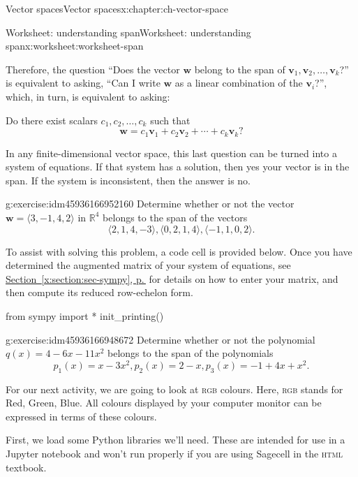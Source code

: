 \documentclass[oneside,10pt,]{book}
\newcommand{\xreffont}{\relax}
\newcommand{\initialism}[1]{\textsc{\MakeLowercase{#1}}}
\numberwithin{equation}{section}
\newcommand{\R}{\mathbb{R}}
\newcommand{\vv}{\mathbf{v}}
\newcommand{\ww}{\mathbf{w}}
\begin{document}
\begin{chapterptx}{Vector spaces}{}{Vector spaces}{}{}{x:chapter:ch-vector-space}
\begin{worksheet-section}{Worksheet: understanding span}{}{Worksheet: understanding span}{}{}{x:worksheet:worksheet-span}
\par
Therefore, the question ``Does the vector \(\ww\) belong to the span of \(\vv_1, \vv_2,\ldots, \vv_k\)?'' is equivalent to asking, ``Can I write \(\ww\) as a linear combination of the \(\vv_i\)?'', which, in turn, is equivalent to asking:%
\par
Do there exist scalars \(c_1,c_2,\ldots, c_k\) such that%
\begin{equation*}
\ww=c_1\vv_1+c_2\vv_2+\cdots +c_k\vv_k\text{?}
\end{equation*}
%
\par
In any finite-dimensional vector space, this last question can be turned into a system of equations. If that system has a solution, then yes \textemdash{} your vector is in the span. If the system is inconsistent, then the answer is no.%
\begin{divisionexercise}{1}{}{}{g:exercise:idm45936166952160}%
Determine whether or not the vector \(\ww=\langle 3,-1, 4, 2\rangle\) in \(\R^4\) belongs to the span of the vectors%
\begin{equation*}
\langle 2, 1, 4, -3\rangle, \langle 0, 2, 1, 4\rangle, \langle -1, 1, 0, 2\rangle\text{.}
\end{equation*}
%
\end{divisionexercise}%
To assist with solving this problem, a code cell is provided below. Once you have determined the augmented matrix of your system of equations, see \hyperref[x:section:sec-sympy]{Section~{\xreffont\ref{x:section:sec-sympy}}, p.\,\pageref{x:section:sec-sympy}} for details on how to enter your matrix, and then compute its reduced row-echelon form.%
\begin{sageinput}
from sympy import *
init_printing()
\end{sageinput}
\begin{divisionexercise}{2}{}{}{g:exercise:idm45936166948672}%
Determine whether or not the polynomial \(q(x) = 4-6x-11x^2\) belongs to the span of the polynomials%
\begin{equation*}
p_1(x) = x-3x^2, p_2(x)=2-x, p_3(x) = -1+4x+x^2\text{.}
\end{equation*}
%
\end{divisionexercise}%
For our next activity, we are going to look at \initialism{RGB} colours. Here, \initialism{RGB} stands for Red, Green, Blue. All colours displayed by your computer monitor can be expressed in terms of these colours.%
\par
First, we load some Python libraries we'll need. These are intended for use in a Jupyter notebook and won't run properly if you are using Sagecell in the \initialism{HTML} textbook.%

\end{worksheet-section}
\end{chapterptx}
\end{document}
